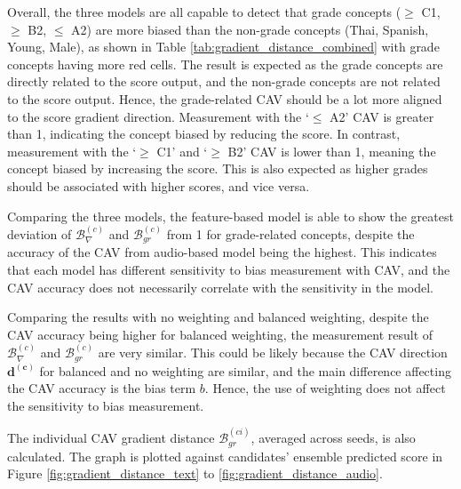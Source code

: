 Overall, the three models are all capable to detect that grade concepts ($\geq$ C1, $\geq$ B2, $\leq$ A2) are more biased than the non-grade concepts (Thai, Spanish, Young, Male), as shown in Table \ref{tab:gradient_distance_combined} with grade concepts having more red cells. The result is expected as the grade concepts are directly related to the score output, and the non-grade concepts are not related to the score output. Hence, the grade-related CAV should be a lot more aligned to the score gradient direction. Measurement with the `$\leq$ A2' CAV is greater than 1, indicating the concept biased by reducing the score. In contrast, measurement with the `$\geq$ C1' and `$\geq$ B2' CAV is lower than 1, meaning the concept biased by increasing the score. This is also expected as higher grades should be associated with higher scores, and vice versa.

Comparing the three models, the feature-based model is able to show the greatest deviation of $\mathcal{B}^{(c)}_{\nabla}$ and $\mathcal{B}^{(c)}_{gr}$ from 1 for grade-related concepts, despite the accuracy of the CAV from audio-based model being the highest. This indicates that each model has different sensitivity to bias measurement with CAV, and the CAV accuracy does not necessarily correlate with the sensitivity in the model.

Comparing the results with no weighting and balanced weighting, despite the CAV accuracy being higher for balanced weighting, the measurement result of $\mathcal{B}^{(c)}_{\nabla}$ and $\mathcal{B}^{(c)}_{gr}$ are very similar. This could be likely because the CAV direction $\boldsymbol{d^{(c)}}$ for balanced and no weighting are similar, and the main difference affecting the CAV accuracy is the bias term $b$. Hence, the use of weighting does not affect the sensitivity to bias measurement.

The individual CAV gradient distance $\mathcal{B}^{(ci)}_{gr}$, averaged across seeds, is also calculated. The graph is plotted against candidates’ ensemble predicted score in Figure \ref{fig:gradient_distance_text} to \ref{fig:gradient_distance_audio}.

